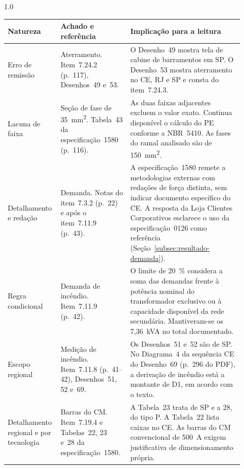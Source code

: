\par\noindent
\begin{minipage}{\linewidth}
  \label{qua:leitura-1580}
  \vspace{0.55\baselineskip}
  \centering
  \begin{Spacing}{1.0}
  {\small
  \renewcommand{\arraystretch}{1.12}
  \setlength{\tabcolsep}{4pt}
  \begin{tabular}{|>{\raggedright\arraybackslash}p{0.16\linewidth}|>{\raggedright\arraybackslash}p{0.29\linewidth}|>{\raggedright\arraybackslash}p{0.46\linewidth}|}
    \hline
    \textbf{Natureza} & \textbf{Achado e referência} & \textbf{Implicação para a leitura} \\\hline
    Erro de remissão & Aterramento. Item~7.24.2 (p.~117), Desenhos~49 e~53. & O Desenho~49 mostra tela de cabine de barramentos em SP. O Desenho~53 mostra aterramento no CE, RJ e SP e consta do item~7.24.3. \\\hline
    Lacuna de faixa & Seção de fase de 35~mm\textsuperscript{2}. Tabela~43 da especificação~1580 (p.~116). & As duas faixas adjacentes excluem o valor exato. Continua disponível o cálculo do PE conforme a NBR~5410. As fases do ramal analisado são de 150~mm\textsuperscript{2}. \\\hline
    Detalhamento e redação & Demanda. Notas do item~7.3.2 (p.~22) e após o item~7.11.9 (p.~43). & A especificação~1580 remete a metodologias externas com redações de força distinta, sem indicar documento específico do CE. A resposta da Loja Clientes Corporativos esclarece o uso da especificação~0126 como referência (Seção~\ref{subsec:resultado-demanda}). \\\hline
    Regra condicional & Demanda de incêndio. Item~7.11.9 (p.~42). & O limite de 20~\% considera a soma das demandas frente à potência nominal do transformador exclusivo ou à capacidade disponível da rede secundária. Mantiveram-se os 7,36~kVA no total documentado. \\\hline
    Escopo regional & Medição de incêndio. Item~7.11.8 (p.~41--42), Desenhos~51, 52 e~69. & Os Desenhos~51 e~52 são de SP. No Diagrama~4 da sequência CE do Desenho~69 (p.~296 do PDF), a derivação de incêndio está a montante de D1, em acordo com o texto. \\\hline
    Detalhamento regional e por tecnologia & Barras do CM. Item~7.19.4 e Tabelas~22, 23 e~28 da especificação~1580. & A Tabela~23 trata de SP e a 28, do tipo P. A Tabela~22 lista caixas no CE. As barras do CM convencional de 500~A exigem justificativa de dimensionamento própria. \\\hline

\end{tabular}}
\end{Spacing}
\end{minipage}

